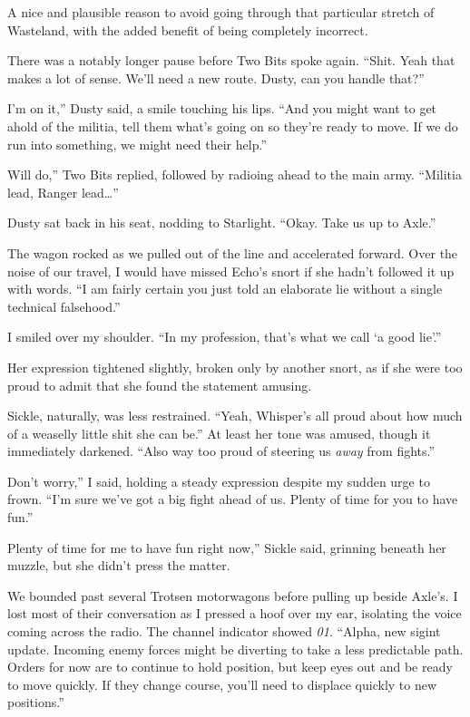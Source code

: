 A nice and plausible reason to avoid going through that particular stretch of Wasteland, with the added benefit of being completely incorrect.

There was a notably longer pause before Two Bits spoke again. “Shit. Yeah that makes a lot of sense. We’ll need a new route. Dusty, can you handle that?”

\leavevmode{}I’m on it,” Dusty said, a smile touching his lips. “And you might want to get ahold of the militia, tell them what’s going on so they’re ready to move. If we do run into something, we might need their help.”

\leavevmode{}Will do,” Two Bits replied, followed by radioing ahead to the main army. “Militia lead, Ranger lead…”

Dusty sat back in his seat, nodding to Starlight. “Okay. Take us up to Axle.”

The wagon rocked as we pulled out of the line and accelerated forward. Over the noise of our travel, I would have missed Echo’s snort if she hadn’t followed it up with words. “I am fairly certain you just told an elaborate lie without a single technical falsehood.”

I smiled over my shoulder. “In my profession, that’s what we call ‘a good lie’.”

Her expression tightened slightly, broken only by another snort, as if she were too proud to admit that she found the statement amusing.

Sickle, naturally, was less restrained. “Yeah, Whisper’s all proud about how much of a weaselly little shit she can be.” At least her tone was amused, though it immediately darkened. “Also way too proud of steering us \textit{away} from fights.”

\leavevmode{}Don’t worry,” I said, holding a steady expression despite my sudden urge to frown. “I’m sure we’ve got a big fight ahead of us. Plenty of time for you to have fun.”

\leavevmode{}Plenty of time for me to have fun right now,” Sickle said, grinning beneath her muzzle, but she didn’t press the matter.

We bounded past several Trotsen motorwagons before pulling up beside Axle’s. I lost most of their conversation as I pressed a hoof over my ear, isolating the voice coming across the radio. The channel indicator showed \textit{01}. “Alpha, new sigint update. Incoming enemy forces might be diverting to take a less predictable path. Orders for now are to continue to hold position, but keep eyes out and be ready to move quickly. If they change course, you’ll need to displace quickly to new positions.”

